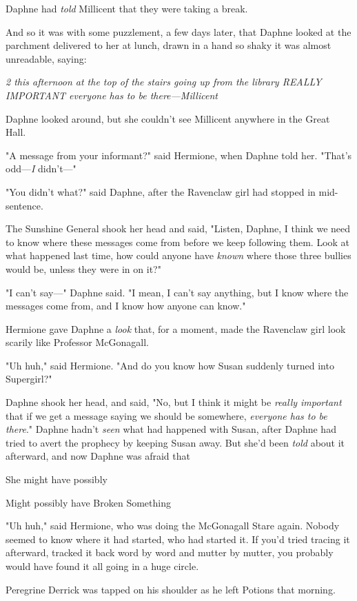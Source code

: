 Daphne had \emph{told} Millicent that they were taking a break.

And so it was with some puzzlement, a few days later, that Daphne looked at the
parchment delivered to her at lunch, drawn in a hand so shaky it was almost
unreadable, saying:

\emph{2 this afternoon at the top of the stairs going up from the library
REALLY IMPORTANT everyone has to be there---Millicent}

Daphne looked around, but she couldn't see Millicent anywhere in the Great Hall.

"A message from your informant?" said Hermione, when Daphne told her. "That's
odd---\emph{I} didn't\mbox{---}"

"You didn't what?" said Daphne, after the Ravenclaw girl had stopped in
mid-sentence.

The Sunshine General shook her head and said, "Listen, Daphne, I think we need
to know where these messages come from before we keep following them. Look at
what happened last time, how could anyone have \emph{known} where those three
bullies would be, unless they were in on it?"

"I can't say\mbox{---}" Daphne said. "I mean, I can't say anything, but I know where
the messages come from, and I know how anyone can know."

Hermione gave Daphne a \emph{look} that, for a moment, made the Ravenclaw girl
look scarily like Professor McGonagall.

"Uh huh," said Hermione. "And do you know how Susan suddenly turned into
Supergirl?"

Daphne shook her head, and said, "No, but I think it might be \emph{really
important} that if we get a message saying we should be somewhere,
\emph{everyone has to be there}." Daphne hadn't \emph{seen} what had happened
with Susan, after Daphne had tried to avert the prophecy by keeping Susan away.
But she'd been \emph{told} about it afterward, and now Daphne was afraid
that{\el}

She might have possibly{\el}

Might possibly have Broken Something{\el}

"Uh huh," said Hermione, who was doing the McGonagall Stare again.
\sbreak
Nobody seemed to know where it had started, who had started it. If you'd tried
tracing it afterward, tracked it back word by word and mutter by mutter, you
probably would have found it all going in a huge circle.

Peregrine Derrick was tapped on his shoulder as he left Potions that morning.

